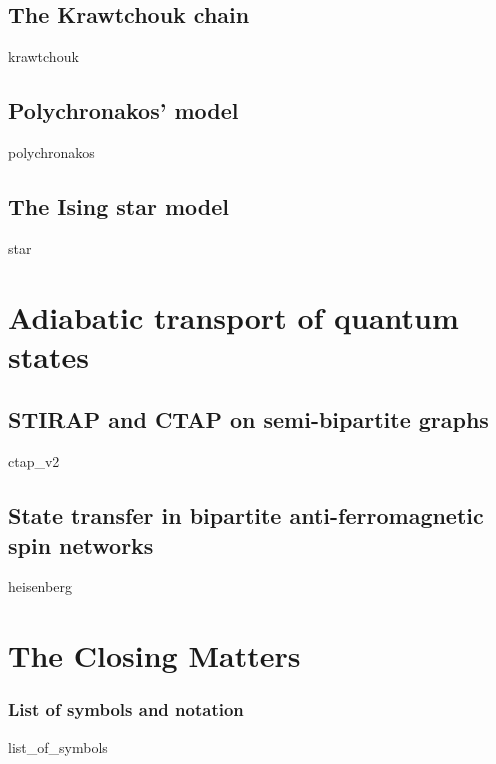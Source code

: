\documentclass[12pt,twoside]{book}
\providecommand{\mypart}[1]{\part{#1}}
\theoremstyle{definition}
\begin{document}
\chapter{The Krawtchouk chain}
\label{chap:krawtchouk}
{krawtchouk}
%

\chapter{Polychronakos' model}
\label{chap:pc}
{polychronakos}


\chapter{The Ising star model}
\graphicspath{{./2_star/img/}}
\label{chap:star}
{star}


\cleardoublepage
\mypart{Adiabatic transport of quantum states}
\label{part:adiabatic}

\graphicspath{{./3_ctap/img/}}
\chapter{STIRAP and CTAP on semi-bipartite graphs}
\label{chap:ctap}
{ctap_v2}


\chapter{State transfer in bipartite anti-ferromagnetic spin networks}
\label{chap:heisenberg}
{heisenberg}




\mypart{The Closing Matters}


\printbibliography[heading=bibintoc]



\backmatter
\pagestyle{lastpages}

\section*{List of symbols and notation}
{list_of_symbols}
\end{document}
